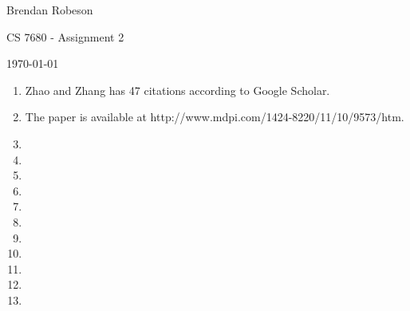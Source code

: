 \documentclass[11pt]{article}
\begin{document}
\noindent Brendan Robeson

\noindent CS 7680 - Assignment 2

\noindent \today

\medskip

\begin{enumerate}
    \item Zhao and Zhang \cite{s111009573} has 47 citations according to Google
        Scholar.

    \item The paper is available at
        http://www.mdpi.com/1424-8220/11/10/9573/htm.

    \item 
    \item 
    \item 
    \item 
    \item 
    \item 
    \item 
    \item 
    \item 
    \item 
    \item 
\end{enumerate}



\end{document}
